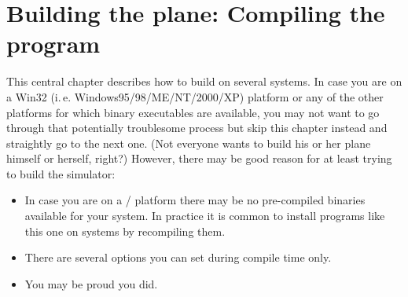 
\chapter{Building the plane: Compiling the program\label{building}}

This central chapter describes how to build \FlightGear{} on several systems. In case you
are on a Win32 (i.\,e. Windows95/98/ME/NT/2000/XP) platform or any of the other platforms
for which binary executables are available, you may not want to go through that
potentially troublesome process but skip this chapter instead and straightly go to the
next one. (Not everyone wants to build his or her plane himself or herself, right?)
However, there may be good reason for at least trying to build the simulator:

\begin{itemize}
\item In case you are on a / platform there may be no
pre-compiled binaries available for your system. In
practice it is common to install programs like this one on  systems by
recompiling them.

\item There are several options you can set during compile time only.

\item You may be proud you did.
\end{itemize}

